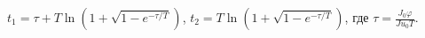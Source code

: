 $t_1 = \tau + T \ln{\left( 1 + \sqrt{1 - e^{-\tau / T}}\right)}$,
$t_2 = T\ln{\left(1 + \sqrt{1 - e^{-\tau / T}}\right)}$,
где $\tau = \frac{J_0 \varphi}{Ju_0T}$.
